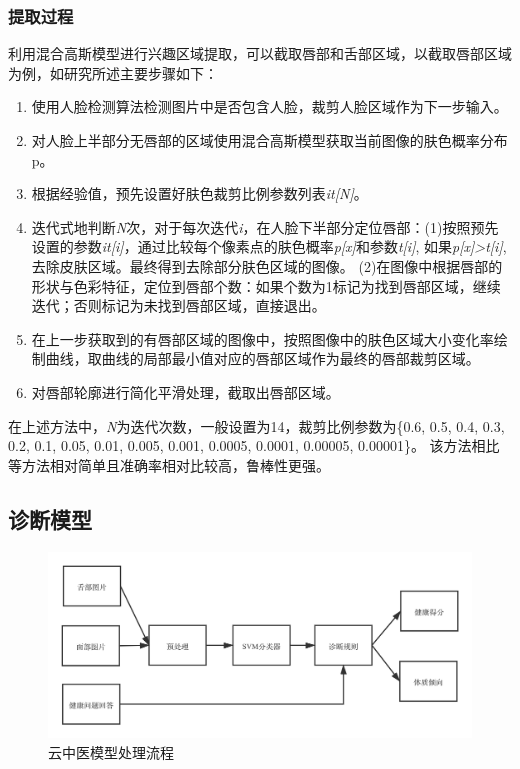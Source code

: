 \subsubsection{提取过程}

利用混合高斯模型进行兴趣区域提取，可以截取唇部和舌部区域，以截取唇部区域为例，如研究\cite{Hu2016Robust}所述主要步骤如下：
\begin{enumerate}
    \item 使用人脸检测算法检测图片中是否包含人脸，裁剪人脸区域作为下一步输入。

    \item 对人脸上半部分无唇部的区域使用混合高斯模型获取当前图像的肤色概率分布p。

    \item 根据经验值，预先设置好肤色裁剪比例参数列表\textit{it[N]}。

    \item 迭代式地判断\textit{N}次，对于每次迭代\textit{i}，在人脸下半部分定位唇部：(1)按照预先设置的参数\textit{it[i]}，通过比较每个像素点的肤色概率\textit{p[x]}和参数\textit{t[i]}, 如果\textit{p[x]>t[i]}, 去除皮肤区域。最终得到去除部分肤色区域的图像。
(2)在图像中根据唇部的形状与色彩特征，定位到唇部个数：如果个数为1标记为找到唇部区域，继续迭代；否则标记为未找到唇部区域，直接退出。

\item 在上一步获取到的有唇部区域的图像中，按照图像中的肤色区域大小变化率绘制曲线，取曲线的局部最小值对应的唇部区域作为最终的唇部裁剪区域。

\item 对唇部轮廓进行简化平滑处理，截取出唇部区域。
\end{enumerate}

在上述方法中，\textit{N}为迭代次数，一般设置为14，裁剪比例参数为\{0.6, 0.5, 0.4, 0.3, 0.2, 0.1, 0.05, 0.01, 0.005, 0.001, 0.0005, 0.0001, 0.00005, 0.00001\}。
该方法相比\cite{rahman2014lip, li2010automatic, li2020tcminet}等方法相对简单且准确率相对比较高，鲁棒性更强。

\subsection{诊断模型}
\begin{figure}[htb]
    \centering
    \includegraphics[width=15cm]{images/cloud_med.png}
    \caption{云中医模型处理流程}
    \label{cloudmed}
\end{figure}

